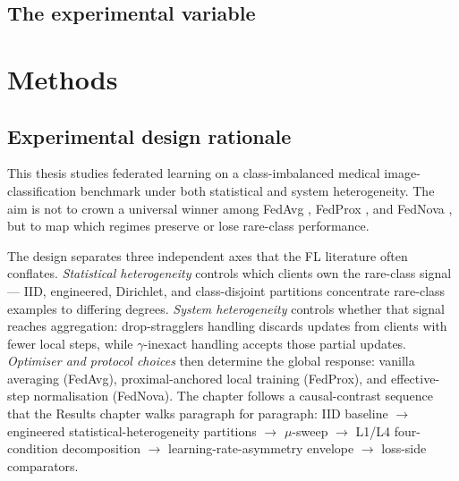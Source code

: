 \documentclass[11pt,a4paper]{report}
\begin{document}
\section{The experimental variable}
\label{sec:prob-experimental-variable}


\chapter{Methods}
\label{ch:methods}


\section{Experimental design rationale}
\label{sec:method-rationale}

This thesis studies federated learning on a class-imbalanced medical
image-classification benchmark under both statistical and system
heterogeneity. The aim is not to crown a universal winner among FedAvg
\citep{mcmahan2017fedavg}, FedProx \citep{li2020fedprox}, and FedNova
\citep{wang2020fednova}, but to map which regimes preserve or lose
rare-class performance.

The design separates three independent axes that the FL literature
often conflates. \emph{Statistical heterogeneity} controls which clients
own the rare-class signal --- IID, engineered, Dirichlet, and
class-disjoint partitions concentrate rare-class examples to differing
degrees. \emph{System heterogeneity} controls whether that signal
reaches aggregation: drop-stragglers handling discards updates from
clients with fewer local steps, while $\gamma$-inexact handling accepts
those partial updates. \emph{Optimiser and protocol choices} then
determine the global response: vanilla averaging (FedAvg),
proximal-anchored local training (FedProx), and effective-step
normalisation (FedNova). The chapter follows a causal-contrast
sequence that the Results chapter walks paragraph for paragraph:
IID baseline $\to$ engineered statistical-heterogeneity partitions
$\to$ $\mu$-sweep $\to$ L1/L4 four-condition decomposition $\to$
learning-rate-asymmetry envelope $\to$ loss-side comparators.
\end{document}
